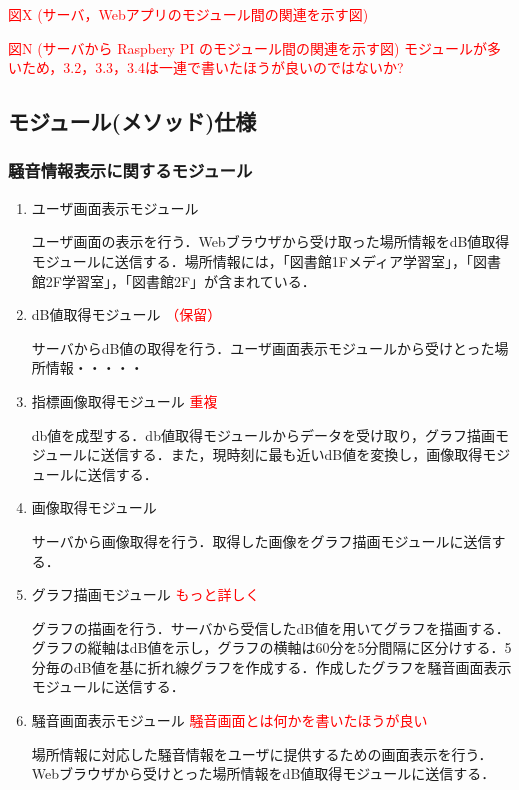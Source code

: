 \textcolor{red}{図X (サーバ，Webアプリのモジュール間の関連を示す図)}

\textcolor{red}{図N (サーバから Raspbery PI のモジュール間の関連を示す図)}
\textcolor{red}{モジュールが多いため，3.2，3.3，3.4は一連で書いたほうが良いのではないか?}
\subsection{モジュール(メソッド)仕様}
\subsubsection{騒音情報表示に関するモジュール}
\begin{enumerate}
\renewcommand{\labelenumi}{(\arabic{enumi})}
\item  ユーザ画面表示モジュール
 
ユーザ画面の表示を行う．Webブラウザから受け取った場所情報をdB値取得モジュールに送信する．場所情報には，「図書館1Fメディア学習室」，「図書館2F学習室」，「図書館2F」が含まれている．

\item dB値取得モジュール \textcolor{red}{（保留）}

サーバからdB値の取得を行う．ユーザ画面表示モジュールから受けとった場所情報・・・・・

\item 指標画像取得モジュール  \textcolor{red}{重複}

db値を成型する．db値取得モジュールからデータを受け取り，グラフ描画モジュールに送信する．また，現時刻に最も近いdB値を変換し，画像取得モジュールに送信する．

\item 画像取得モジュール 

サーバから画像取得を行う．取得した画像をグラフ描画モジュールに送信する．

\item グラフ描画モジュール \textcolor{red}{もっと詳しく}

グラフの描画を行う．サーバから受信したdB値を用いてグラフを描画する．グラフの縦軸はdB値を示し，グラフの横軸は60分を5分間隔に区分けする．5分毎のdB値を基に折れ線グラフを作成する．作成したグラフを騒音画面表示モジュールに送信する．


\item 騒音画面表示モジュール \textcolor{red}{騒音画面とは何かを書いたほうが良い}

場所情報に対応した騒音情報をユーザに提供するための画面表示を行う．Webブラウザから受けとった場所情報をdB値取得モジュールに送信する．



\end{enumerate}
